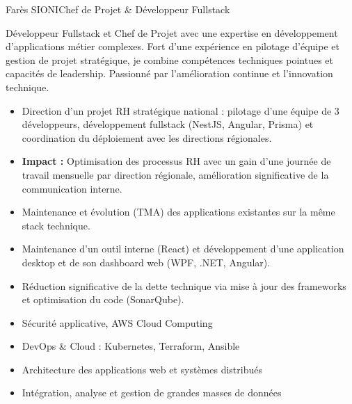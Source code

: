 \documentclass[a4paper,11pt]{article}
\begin{document}
\begin{cv}[profile][1.9]
{Farès SIONI}{Chef de Projet \& Développeur Fullstack}

Développeur Fullstack et Chef de Projet avec une expertise en développement d'applications métier complexes. Fort d'une expérience en pilotage d'équipe et gestion de projet stratégique, je combine compétences techniques pointues et capacités de leadership. Passionné par l'amélioration continue et l'innovation technique.

\begin{cvevent}[08/2023][08/2025]
    \begin{itemize}
        \item Direction d'un projet RH stratégique national : pilotage d'une équipe de 3 développeurs, développement fullstack (NestJS, Angular, Prisma) et coordination du déploiement avec les directions régionales.
        \item \textbf{Impact :} Optimisation des processus RH avec un gain d'une journée de travail mensuelle par direction régionale, amélioration significative de la communication interne.
        \newline
        \item Maintenance et évolution (TMA) des applications existantes sur la même stack technique.
    \end{itemize}
\end{cvevent}

\cvseparator[2]
\begin{cvevent}[06/2023][08/2023]
    \begin{itemize}
        \item Maintenance d'un outil interne (React) et développement d'une application desktop et de son dashboard web (WPF, .NET, Angular).
        \item Réduction significative de la dette technique via mise à jour des frameworks et optimisation du code (SonarQube).
    \end{itemize}
\end{cvevent}

\begin{cvevent}[2023][2025]
    \begin{itemize}
        \item Sécurité applicative, AWS Cloud Computing
        \item DevOps \& Cloud : Kubernetes, Terraform, Ansible
        \item Architecture des applications web et systèmes distribués
        \item Intégration, analyse et gestion de grandes masses de données
    \end{itemize}
\end{cvevent}


\end{cv}
\end{document}
